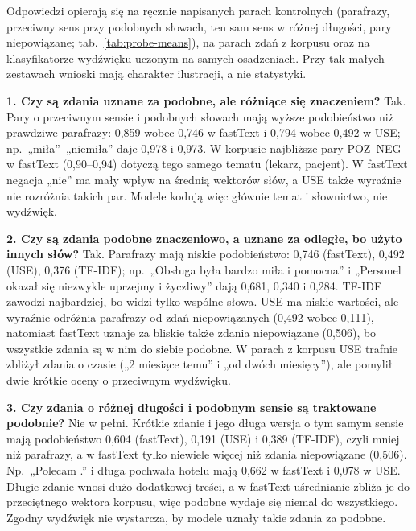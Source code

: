 \documentclass[11pt,a4paper]{article}
\begin{document}
Odpowiedzi opierają się na ręcznie napisanych parach kontrolnych (parafrazy, przeciwny sens przy podobnych słowach,
ten sam sens w różnej długości, pary niepowiązane; tab.~\ref{tab:probe-means}), na parach zdań z korpusu oraz na
klasyfikatorze wydźwięku uczonym na samych osadzeniach. Przy tak małych zestawach wnioski mają charakter
ilustracji, a nie statystyki.

\begin{table}[H]
\centering\small

\caption{Średnie podobieństwo kosinusowe par kontrolnych według kategorii.}
\label{tab:probe-means}
\end{table}

\textbf{1. Czy są zdania uznane za podobne, ale różniące się znaczeniem?} Tak. Pary o przeciwnym sensie i podobnych
słowach mają wyższe podobieństwo niż prawdziwe parafrazy: 0,859 wobec 0,746 w fastText i 0,794 wobec 0,492 w USE;
np.\ „miła''--„niemiła'' daje 0,978 i 0,973. W korpusie najbliższe pary POZ--NEG w fastText (0,90--0,94) dotyczą tego
samego tematu (lekarz, pacjent). W fastText negacja „nie'' ma mały wpływ na średnią wektorów słów, a USE także wyraźnie
nie rozróżnia takich par. Modele kodują więc głównie temat i słownictwo, nie wydźwięk.

\textbf{2. Czy są zdania podobne znaczeniowo, a uznane za odległe, bo użyto innych słów?} Tak. Parafrazy mają niskie
podobieństwo: 0,746 (fastText), 0,492 (USE), 0,376 (TF-IDF); np.\ „Obsługa była bardzo miła i pomocna'' i „Personel okazał
się niezwykle uprzejmy i życzliwy'' dają 0,681, 0,340 i 0,284. TF-IDF zawodzi najbardziej, bo widzi tylko wspólne
słowa. USE ma niskie wartości, ale wyraźnie odróżnia parafrazy od zdań niepowiązanych (0,492 wobec 0,111), natomiast
fastText uznaje za bliskie także zdania niepowiązane (0,506), bo wszystkie zdania są w nim do siebie podobne. W parach
z korpusu USE trafnie zbliżył zdania o czasie („2 miesiące temu'' i „od dwóch miesięcy''), ale pomylił dwie krótkie
oceny o przeciwnym wydźwięku.

\textbf{3. Czy zdania o różnej długości i podobnym sensie są traktowane podobnie?} Nie w pełni. Krótkie zdanie i jego
długa wersja o tym samym sensie mają podobieństwo 0,604 (fastText), 0,191 (USE) i 0,389 (TF-IDF), czyli mniej niż
parafrazy, a w fastText tylko niewiele więcej niż zdania niepowiązane (0,506). Np.\ „Polecam .'' i długa pochwała hotelu
mają 0,662 w fastText i 0,078 w USE. Długie zdanie wnosi dużo dodatkowej treści, a w fastText uśrednianie zbliża je do
przeciętnego wektora korpusu, więc podobne wydaje się niemal do wszystkiego. Zgodny wydźwięk nie wystarcza, by modele
uznały takie zdania za podobne.
\end{document}
